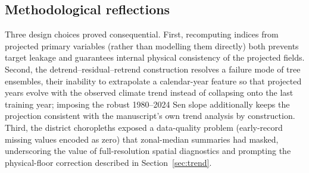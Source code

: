 \documentclass[pdflatex,sn-basic,lineno]{sn-jnl}
\begin{document}
\subsection{Methodological reflections}
Three design choices proved consequential. First, recomputing indices from
projected primary variables (rather than modelling them directly) both prevents
target leakage and guarantees internal physical consistency of the projected
fields. Second, the detrend--residual--retrend construction resolves a failure
mode of tree ensembles, their inability to extrapolate a calendar-year
feature so that projected years evolve with the observed climate trend instead
of collapsing onto the last training year; imposing the robust 1980--2024 Sen
slope additionally keeps the projection consistent with the manuscript's own
trend analysis by construction. Third, the district choropleths exposed a
data-quality problem (early-record missing values encoded as zero) that
zonal-median summaries had masked, underscoring the value of full-resolution
spatial diagnostics and prompting the physical-floor correction described in
Section~\ref{sec:trend}.
\end{document}
